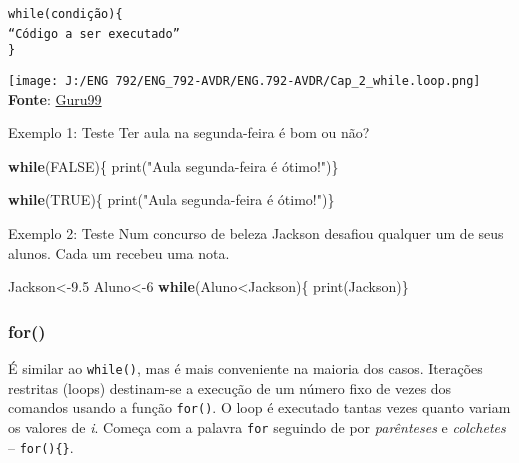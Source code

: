 \documentclass[
]{book}
\newenvironment{Shaded}{\begin{snugshade}}{\end{snugshade}}
\newcommand{\ConstantTok}[1]{\textcolor[rgb]{0.00,0.00,0.00}{#1}}
\newcommand{\ControlFlowTok}[1]{\textcolor[rgb]{0.13,0.29,0.53}{\textbf{#1}}}
\newcommand{\DecValTok}[1]{\textcolor[rgb]{0.00,0.00,0.81}{#1}}
\newcommand{\FloatTok}[1]{\textcolor[rgb]{0.00,0.00,0.81}{#1}}
\newcommand{\FunctionTok}[1]{\textcolor[rgb]{0.00,0.00,0.00}{#1}}
\newcommand{\NormalTok}[1]{#1}
\newcommand{\OtherTok}[1]{\textcolor[rgb]{0.56,0.35,0.01}{#1}}
\newcommand{\SpecialCharTok}[1]{\textcolor[rgb]{0.00,0.00,0.00}{#1}}
\newcommand{\StringTok}[1]{\textcolor[rgb]{0.31,0.60,0.02}{#1}}
\begin{document}
\texttt{while(condição)\{}~\\
\texttt{“Código\ a\ ser\ executado”}~\\
\texttt{\}}

\texttt{[image: J:/ENG 792/ENG\_792-AVDR/ENG.792-AVDR/Cap\_2\_while.loop.png]}\\
\textbf{Fonte}: \href{https://www.guru99.com/r-while-loop.html}{Guru99}

Exemplo 1: Teste
Ter aula na segunda-feira é bom ou não?

\begin{Shaded}
\begin{Highlighting}[]
\ControlFlowTok{while}\NormalTok{(}\ConstantTok{FALSE}\NormalTok{)\{  }
  \FunctionTok{print}\NormalTok{(}\StringTok{"Aula segunda{-}feira é ótimo!"}\NormalTok{)\}}
\end{Highlighting}
\end{Shaded}

\begin{Shaded}
\begin{Highlighting}[]
\ControlFlowTok{while}\NormalTok{(}\ConstantTok{TRUE}\NormalTok{)\{  }
  \FunctionTok{print}\NormalTok{(}\StringTok{"Aula segunda{-}feira é ótimo!"}\NormalTok{)\}}
\end{Highlighting}
\end{Shaded}

Exemplo 2: Teste
Num concurso de beleza Jackson desafiou qualquer um de seus alunos. Cada um recebeu uma nota.

\begin{Shaded}
\begin{Highlighting}[]
\NormalTok{Jackson}\OtherTok{\textless{}{-}}\FloatTok{9.5}  
\NormalTok{Aluno}\OtherTok{\textless{}{-}}\DecValTok{6}  
\ControlFlowTok{while}\NormalTok{(Aluno}\SpecialCharTok{\textless{}}\NormalTok{Jackson)\{  }
  \FunctionTok{print}\NormalTok{(Jackson)\} }
\end{Highlighting}
\end{Shaded}

\hypertarget{for}{%
\subsubsection{for()}\label{for}}

É similar ao \texttt{while()}, mas é mais conveniente na maioria dos casos.
Iterações restritas (loops) destinam-se a execução de um número fixo de vezes dos comandos usando a função \texttt{for()}.
O loop é executado tantas vezes quanto variam os valores de \emph{i}.
Começa com a palavra \texttt{for} seguindo de por \emph{parênteses} e \emph{colchetes} -- \texttt{for()\{\}}.
\end{document}
